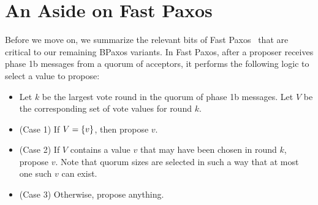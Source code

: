 \documentclass{mwhittaker}
\begin{document}
\section{An Aside on Fast Paxos}
Before we move on, we summarize the relevant bits of Fast
Paxos~\cite{lamport2006fast} that are critical to our remaining BPaxos
variants. In Fast Paxos, after a proposer receives phase 1b messages from a
quorum of acceptors, it performs the following logic to select a value to
propose:
\begin{itemize}
  \item
    Let $k$ be the largest vote round in the quorum of phase 1b messages.
    Let $V$ be the corresponding set of vote values for round $k$.
  \item
    (Case 1) If $V = \{v\}$, then propose $v$.
  \item
    (Case 2) If $V$ contains a value $v$ that may have been chosen in round
    $k$, propose $v$. Note that quorum sizes are selected in such a way that at
    most one such $v$ can exist.
  \item
    (Case 3) Otherwise, propose anything.
\end{itemize}
\end{document}
